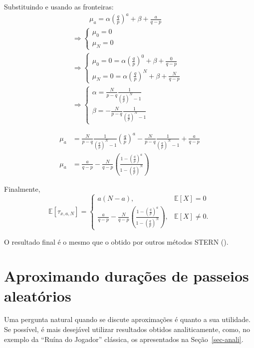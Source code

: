 \documentclass[
  brazilian,
  12pt,
]{article}
\theoremstyle{definition}
\theoremstyle{definition}
\theoremstyle{remark}
\begin{document}
Substituindo e usando as fronteiras: \[
\begin{aligned}
& \phantom{\Rightarrow;;} \mu_{a} = \alpha \left( \frac{q}{p} \right) ^a + \beta + \frac{a}{q-p} \\
& \Rightarrow \begin{cases} \mu_{0} = 0 \\ \mu_{N} = 0 \end{cases}\\
& \Rightarrow
\begin{cases} \mu_{0} = 0 = \alpha \left( \frac{q}{p} \right) ^0 + \beta + \frac{0}{q-p} \\ 
              \mu_{N} = 0 = \alpha \left( \frac{q}{p} \right) ^N + \beta + \frac{N}{q-p}   \end{cases}\\
& \Rightarrow 
\begin{cases} \alpha = \frac{N}{p-q}\frac{1}{\left( \frac{q}{p} \right)^N-1} \\ 
              \beta  = -\frac{N}{p-q}\frac{1}{\left( \frac{q}{p} \right)^N-1} \end{cases} \\ \\ \\
\mu_{a} &= \frac{N}{p-q}\frac{1}{\left( \frac{q}{p} \right)^N-1} \left( \frac{q}{p} \right)^a - \frac{N}{p-q}\frac{1}{\left( \frac{q}{p} \right)^N-1} + \frac{a}{q-p} \\
\mu_{a} & = \frac{a}{q-p}-\frac{N}{q-p} \left( \frac{1- \left( \frac{q}{p} \right)^a}
        {1- \left( \frac{q}{p} \right)^N}\right)
\end{aligned}
\]

Finalmente, \[
\mathbb{E}[\tau_{x, a, N}] = 
\begin{cases}
a(N-a), & \mathbb{E}[X] = 0 \\
\frac{a}{q-p}-\frac{N}{q-p} \left( \frac{1- \left( \frac{q}{p} \right)^a} {1- \left( \frac{q}{p} \right)^N}\right), &
\mathbb{E}[X] \neq 0.
\end{cases}
\]

O resultado final é o mesmo que o obtido por outros métodos STERN
().

\section{Aproximando durações de passeios
aleatórios}\label{aproximando-durauxe7uxf5es-de-passeios-aleatuxf3rios}

Uma pergunta natural quando se discute aproximações é quanto a sua
utilidade. Se possível, é mais desejável utilizar resultados obtidos
analiticamente, como, no exemplo da ``Ruína do Jogador'' clássica, os
apresentados na Seção~\ref{sec-anali}.
\end{document}
